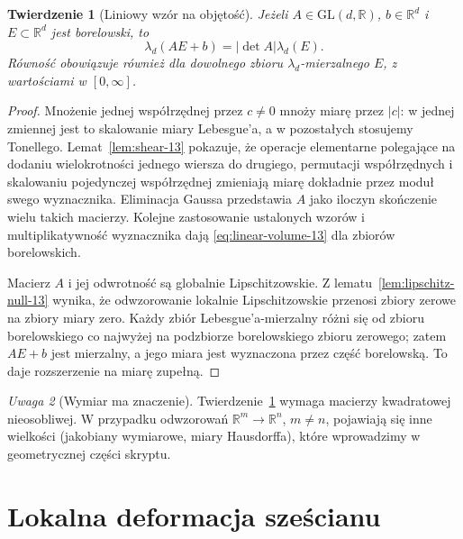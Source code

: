 \documentclass[11pt,a4paper,oneside]{book}
\numberwithin{equation}{chapter}
\theoremstyle{plain}
\newtheorem{twierdzenie}{Twierdzenie}[chapter]
\theoremstyle{definition}
\theoremstyle{remark}
\newtheorem{uwaga}[twierdzenie]{Uwaga}
\begin{document}
\begin{twierdzenie}[Liniowy wzór na objętość]
\label{thm:linear-change-13}
Jeżeli $A\in\mathrm{GL}(d,\mathbb R)$, $b\in\mathbb R^d$
i $E\subset\mathbb R^d$ jest borelowski, to
\begin{equation}\label{eq:linear-volume-13}
\lambda_d(AE+b)=|\det A|\lambda_d(E).
\end{equation}
Równość obowiązuje również dla dowolnego zbioru
$\lambda_d$-mierzalnego $E$, z wartościami w $[0,\infty]$.
\end{twierdzenie}
\begin{proof}
Mnożenie jednej współrzędnej przez $c\ne0$ mnoży miarę
przez $|c|$: w jednej zmiennej jest to skalowanie miary
Lebesgue'a, a w pozostałych stosujemy Tonellego.
Lemat~\ref{lem:shear-13} pokazuje, że operacje elementarne
polegające na dodaniu wielokrotności jednego wiersza do drugiego,
permutacji współrzędnych i skalowaniu pojedynczej współrzędnej
zmieniają miarę dokładnie przez moduł swego wyznacznika.
Eliminacja Gaussa przedstawia $A$ jako iloczyn skończenie
wielu takich macierzy. Kolejne zastosowanie ustalonych wzorów
i multiplikatywność wyznacznika dają \eqref{eq:linear-volume-13}
dla zbiorów borelowskich.

Macierz $A$ i jej odwrotność są globalnie Lipschitzowskie.
Z lematu~\ref{lem:lipschitz-null-13} wynika, że odwzorowanie lokalnie
Lipschitzowskie przenosi zbiory zerowe na zbiory miary zero.
Każdy zbiór Lebesgue'a-mierzalny różni się od zbioru borelowskiego
co najwyżej na podzbiorze borelowskiego zbioru zerowego;
zatem $AE+b$ jest mierzalny, a jego miara jest wyznaczona
przez część borelowską. To daje rozszerzenie na miarę zupełną.
\end{proof}

\begin{uwaga}[Wymiar ma znaczenie]
Twierdzenie~\ref{thm:linear-change-13} wymaga
macierzy kwadratowej nieosobliwej. W przypadku odwzorowań
$\mathbb R^m\to\mathbb R^n$, $m\ne n$, pojawiają się
inne wielkości (jakobiany wymiarowe, miary Hausdorffa),
które wprowadzimy w geometrycznej części skryptu.
\end{uwaga}

\section{Lokalna deformacja sześcianu}
\end{document}
